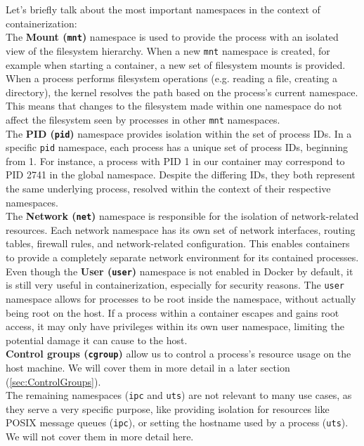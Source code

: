 \documentclass{article}
\begin{document}
Let's briefly talk about the most important namespaces in the context of containerization:
\smallskip \\
The \textbf{Mount (\texttt{mnt})} namespace is used to provide the process with an isolated view 
of the filesystem hierarchy. When a new \texttt{mnt} namespace is created, for example when starting a container, 
a new set of filesystem mounts is provided. When a process performs filesystem operations 
(e.g. reading a file, creating a directory), the kernel resolves the path based on the process's current namespace. 
This means that changes to the filesystem made within one namespace do not affect the 
filesystem seen by processes in other \texttt{mnt} namespaces.
\smallskip \\
The \textbf{PID (\texttt{pid})} namespace provides isolation within the set of process IDs. 
In a specific \texttt{pid} namespace, each process has a unique set of process IDs, 
beginning from 1. For instance, a process with PID 1 in our container may correspond to 
PID 2741 in the global namespace. Despite the differing IDs, they both represent the same underlying process, 
resolved within the context of their respective namespaces.
\smallskip \\
The \textbf{Network (\texttt{net})} namespace is responsible for the isolation of network-related resources. 
Each network namespace has its own set of network interfaces, routing tables, firewall rules, 
and network-related configuration. This enables containers to provide a completely 
separate network environment for its contained processes.
\smallskip \\
Even though the \textbf{User (\texttt{user})} namespace is not enabled in Docker by default, 
it is still very useful in containerization, especially for security reasons. 
The \texttt{user} namespace allows for processes to be root inside the namespace, 
without actually being root on the host. If a process within a container escapes and gains root access, 
it may only have privileges within its own user namespace, limiting the potential damage it can cause to the host.
\smallskip \\
\textbf{Control groups (\texttt{cgroup})} allow us to control a process's resource usage on the host machine. 
We will cover them in more detail in a later section (\ref{sec:ControlGroups}).
\smallskip \\
The remaining namespaces (\texttt{ipc} and \texttt{uts}) are not relevant to many use cases, 
as they serve a very specific purpose, like providing isolation for resources like POSIX message queues (\texttt{ipc}), 
or setting the hostname used by a process (\texttt{uts}). We will not cover them in more detail here.
\end{document}
